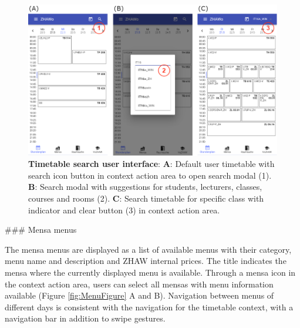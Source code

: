 \begin{markdown}
\begin{figure}[H]
  \includegraphics[width=16cm, center]{./figures/timetable_figure2.png}
  \captionsetup{width=15.5cm}
  \caption[Timetable search user interface]{\textbf{Timetable search user interface}: \textbf{A}: Default user timetable with search icon button in context action area to open search modal (1). \textbf{B}: Search modal with suggestions for students, lecturers, classes, courses and rooms (2). \textbf{C}: Search timetable for specific class with indicator and clear button (3) in context action area.}
  \label{fig:TimetableFigure2}
\end{figure}

### Mensa menus

The mensa menus are displayed as a list of available menus with their category, menu name and description and ZHAW internal prices. The title indicates the mensa where the currently displayed menu is available. Through a mensa icon in the context action area, users can select all mensas with menu information available (Figure \ref{fig:MenuFigure} A and B). Navigation between menus of different days is consistent with the navigation for the timetable context, with a navigation bar in addition to swipe gestures.


\end{markdown}

